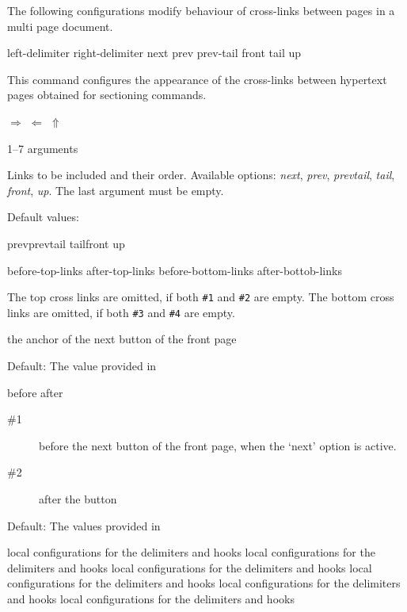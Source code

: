 \documentclass{book}
\begin{document}
The following configurations modify behaviour of cross-links between pages in a multi page document.

 {left-delimiter} {right-delimiter} {next} {prev} {prev-tail} {front} {tail} {up}\EndDoc

This command configures the appearance of the cross-links between hypertext pages obtained for sectioning commands.

\begin{texsource}
   {}{}{$\scriptstyle\Rightarrow$}
   {$\scriptstyle\Leftarrow$}
   {}{}{}{$\scriptstyle\Uparrow$}
\end{texsource}

 {1--7 arguments}\EndDoc

Links to be included and their order. Available
  options: \textit{next}, \textit{prev}, \textit{prevtail}, \textit{tail}, \textit{front}, \textit{up}.
  The last argument must be empty.

Default values:

\begin{texsource}
   {prev}{prevtail}
   {tail}{front}
   {up}{}
\end{texsource}

 {before-top-links} {after-top-links} {before-bottom-links} {after-bottob-links}\EndDoc

The top cross links are omitted, if both \verb|#1| and \verb|#2| are empty.
The bottom cross links are omitted, if both \verb|#3| and \verb|#4| are empty.

 {the anchor of the next button of the front page}\EndDoc

Default: The value provided in 

 {before} {after}\EndDoc

\begin{description}
  \item[\#1]  before the next button of the front page, when the `next'
       option is active.
  \item[\#2]  after the button
\end{description}

    Default: The values provided in 

 {local configurations for the delimiters and hooks}\EndDoc
{} {local configurations for the delimiters and hooks}\EndDoc
{} {local configurations for the delimiters and hooks}\EndDoc
{} {local configurations for the delimiters and hooks}\EndDoc
{} {local configurations for the delimiters and hooks}\EndDoc
{} {local configurations for the delimiters and hooks}\EndDoc
\end{document}
